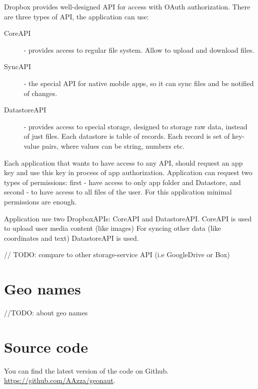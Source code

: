 \documentclass[12pt,a4paper]{article}
\begin{document}
Dropbox provides well-designed API for access with OAuth authorization.
There are three types of API, the application can use:

\begin{description}
    \item[CoreAPI] - provides access to regular file system. Allow to upload and download files.

    \item[SyncAPI] - the special API for native mobile apps, so it can sync files
        and be notified of changes.

    \item[DatastoreAPI] - provides access to special storage, designed to storage
        raw data, instead of just files. Each datastore is table of records. Each record
        is set of key-value pairs, where values can be string, numbers etc.
\end{description}

Each application that wants to have access to any API, should request an app key and
use this key in process of app authorization. Application can request two types of permissions:
first - have access to only app folder and Datastore, and second - to have access to
all files of the user.
For this application minimal permissions are enough.

Application use two DropboxAPIs: CoreAPI and DatastoreAPI.
CoreAPI is used to upload user media content (like images)
For syncing other data (like coordinates and text) DatastoreAPI is used.

// TODO: compare to other storage-service API (i.e GoogleDrive or Box)

\section{Geo names}
//TODO: about geo names

\section{Source code}
    You can find the latest version of the code on Github.
    \url{https://github.com/AAzza/geonaut}.
\end{document}
